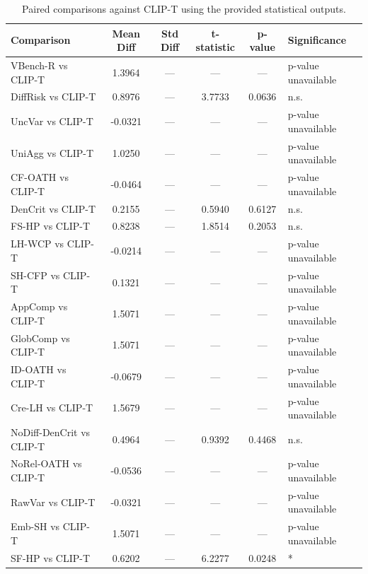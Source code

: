 \documentclass{article}
\begin{document}
\begin{table}[htbp]
    \centering
    \caption{Paired comparisons against CLIP-T using the provided statistical outputs.}
    \label{tab:paired_clip}
    \begin{tabular}{lccccl}
        \toprule
        Comparison & Mean Diff & Std Diff & t-statistic & p-value & Significance \\
        \midrule
        VBench-R vs CLIP-T & 1.3964 & --- & --- & --- & p-value unavailable \\
        DiffRisk vs CLIP-T & 0.8976 & --- & 3.7733 & 0.0636 & n.s. \\
        UncVar vs CLIP-T & -0.0321 & --- & --- & --- & p-value unavailable \\
        UniAgg vs CLIP-T & 1.0250 & --- & --- & --- & p-value unavailable \\
        CF-OATH vs CLIP-T & -0.0464 & --- & --- & --- & p-value unavailable \\
        DenCrit vs CLIP-T & 0.2155 & --- & 0.5940 & 0.6127 & n.s. \\
        FS-HP vs CLIP-T & 0.8238 & --- & 1.8514 & 0.2053 & n.s. \\
        LH-WCP vs CLIP-T & -0.0214 & --- & --- & --- & p-value unavailable \\
        SH-CFP vs CLIP-T & 0.1321 & --- & --- & --- & p-value unavailable \\
        AppComp vs CLIP-T & 1.5071 & --- & --- & --- & p-value unavailable \\
        GlobComp vs CLIP-T & 1.5071 & --- & --- & --- & p-value unavailable \\
        ID-OATH vs CLIP-T & -0.0679 & --- & --- & --- & p-value unavailable \\
        Cre-LH vs CLIP-T & 1.5679 & --- & --- & --- & p-value unavailable \\
        NoDiff-DenCrit vs CLIP-T & 0.4964 & --- & 0.9392 & 0.4468 & n.s. \\
        NoRel-OATH vs CLIP-T & -0.0536 & --- & --- & --- & p-value unavailable \\
        RawVar vs CLIP-T & -0.0321 & --- & --- & --- & p-value unavailable \\
        Emb-SH vs CLIP-T & 1.5071 & --- & --- & --- & p-value unavailable \\
        SF-HP vs CLIP-T & 0.6202 & --- & 6.2277 & 0.0248 & * \\
        \bottomrule
    \end{tabular}
\end{table}
\end{document}
